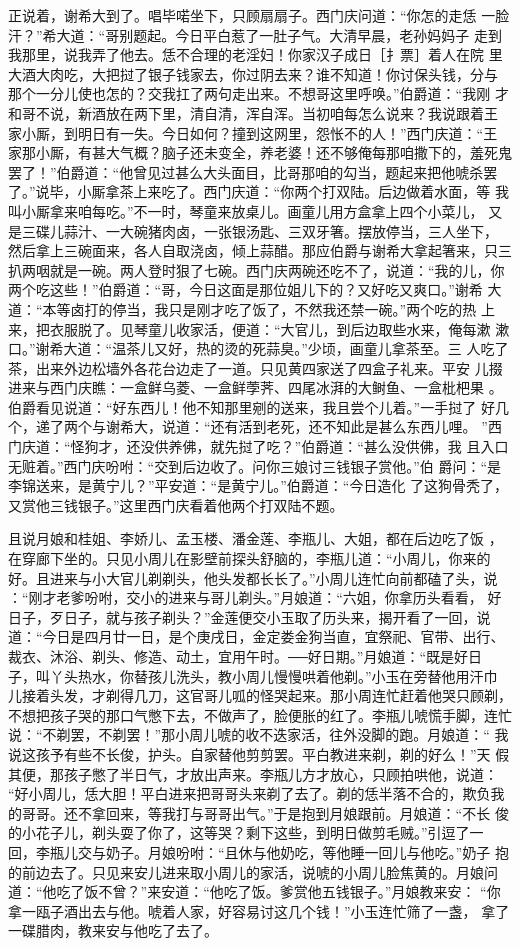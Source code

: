 正说着，谢希大到了。唱毕喏坐下，只顾扇扇子。西门庆问道：“你怎的走恁
一脸汗？”希大道：“哥别题起。今日平白惹了一肚子气。大清早晨，老孙妈妈子
走到我那里，说我弄了他去。恁不合理的老淫妇！你家汉子成日［扌票］着人在院
里大酒大肉吃，大把挝了银子钱家去，你过阴去来？谁不知道！你讨保头钱，分与
那个一分儿使也怎的？交我扛了两句走出来。不想哥这里呼唤。”伯爵道：“我刚
才和哥不说，新酒放在两下里，清自清，浑自浑。当初咱每怎么说来？我说跟着王
家小厮，到明日有一失。今日如何？撞到这网里，怨怅不的人！”西门庆道：“王
家那小厮，有甚大气概？脑子还未变全，养老婆！还不够俺每那咱撒下的，羞死鬼
罢了！”伯爵道：“他曾见过甚么大头面目，比哥那咱的勾当，题起来把他唬杀罢
了。”说毕，小厮拿茶上来吃了。西门庆道：“你两个打双陆。后边做着水面，等
我叫小厮拿来咱每吃。”不一时，琴童来放桌儿。画童儿用方盒拿上四个小菜儿，
又是三碟儿蒜汁、一大碗猪肉卤，一张银汤匙、三双牙箸。摆放停当，三人坐下，
然后拿上三碗面来，各人自取浇卤，倾上蒜醋。那应伯爵与谢希大拿起箸来，只三
扒两咽就是一碗。两人登时狠了七碗。西门庆两碗还吃不了，说道：“我的儿，你
两个吃这些！”伯爵道：“哥，今日这面是那位姐儿下的？又好吃又爽口。”谢希
大道：“本等卤打的停当，我只是刚才吃了饭了，不然我还禁一碗。”两个吃的热
上来，把衣服脱了。见琴童儿收家活，便道：“大官儿，到后边取些水来，俺每漱
漱口。”谢希大道：“温茶儿又好，热的烫的死蒜臭。”少顷，画童儿拿茶至。三
人吃了茶，出来外边松墙外各花台边走了一道。只见黄四家送了四盒子礼来。平安
儿掇进来与西门庆瞧：一盒鲜乌菱、一盒鲜荸荠、四尾冰湃的大鲥鱼、一盒枇杷果
。伯爵看见说道：“好东西儿！他不知那里剜的送来，我且尝个儿着。”一手挝了
好几个，递了两个与谢希大，说道：“还有活到老死，还不知此是甚么东西儿哩。
”西门庆道：“怪狗才，还没供养佛，就先挝了吃？”伯爵道：“甚么没供佛，我
且入口无赃着。”西门庆吩咐：“交到后边收了。问你三娘讨三钱银子赏他。”伯
爵问：“是李锦送来，是黄宁儿？”平安道：“是黄宁儿。”伯爵道：“今日造化
了这狗骨秃了，又赏他三钱银子。”这里西门庆看着他两个打双陆不题。

且说月娘和桂姐、李娇儿、孟玉楼、潘金莲、李瓶儿、大姐，都在后边吃了饭
，在穿廊下坐的。只见小周儿在影壁前探头舒脑的，李瓶儿道：“小周儿，你来的
好。且进来与小大官儿剃剃头，他头发都长长了。”小周儿连忙向前都磕了头，说
：“刚才老爹吩咐，交小的进来与哥儿剃头。”月娘道：“六姐，你拿历头看看，
好日子，歹日子，就与孩子剃头？”金莲便交小玉取了历头来，揭开看了一回，说
道：“今日是四月廿一日，是个庚戌日，金定娄金狗当直，宜祭祀、官带、出行、
裁衣、沐浴、剃头、修造、动土，宜用午时。──好日期。”月娘道：“既是好日
子，叫丫头热水，你替孩儿洗头，教小周儿慢慢哄着他剃。”小玉在旁替他用汗巾
儿接着头发，才剃得几刀，这官哥儿呱的怪哭起来。那小周连忙赶着他哭只顾剃，
不想把孩子哭的那口气憋下去，不做声了，脸便胀的红了。李瓶儿唬慌手脚，连忙
说：“不剃罢，不剃罢！”那小周儿唬的收不迭家活，往外没脚的跑。月娘道：“
我说这孩予有些不长俊，护头。自家替他剪剪罢。平白教进来剃，剃的好么！”天
假其便，那孩子憋了半日气，才放出声来。李瓶儿方才放心，只顾拍哄他，说道：
“好小周儿，恁大胆！平白进来把哥哥头来剃了去了。剃的恁半落不合的，欺负我
的哥哥。还不拿回来，等我打与哥哥出气。”于是抱到月娘跟前。月娘道：“不长
俊的小花子儿，剃头耍了你了，这等哭？剩下这些，到明日做剪毛贼。”引逗了一
回，李瓶儿交与奶子。月娘吩咐：“且休与他奶吃，等他睡一回儿与他吃。”奶子
抱的前边去了。只见来安儿进来取小周儿的家活，说唬的小周儿脸焦黄的。月娘问
道：“他吃了饭不曾？”来安道：“他吃了饭。爹赏他五钱银子。”月娘教来安：
“你拿一瓯子酒出去与他。唬着人家，好容易讨这几个钱！”小玉连忙筛了一盏，
拿了一碟腊肉，教来安与他吃了去了。

